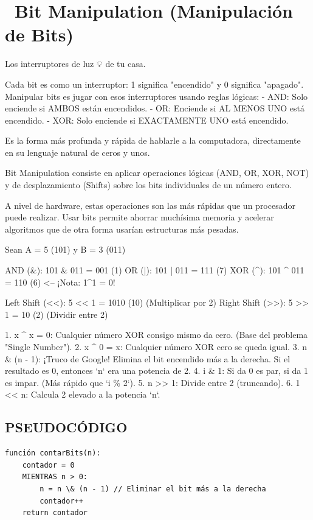 ﻿\chapter[\emj{🔢}~Bit Manipulation (Manipulación de Bits)]{~Bit Manipulation (Manipulación de Bits)}

\begin{dsaquees}
Los interruptores de luz 💡 de tu casa. 

Cada bit es como un interruptor: 1 significa "encendido" y 0 significa
"apagado". Manipular bits es jugar con esos interruptores usando 
reglas lógicas:
- AND: Solo enciende si AMBOS están encendidos.
- OR: Enciende si AL MENOS UNO está encendido.
- XOR: Solo enciende si EXACTAMENTE UNO está encendido.

Es la forma más profunda y rápida de hablarle a la computadora,
directamente en su lenguaje natural de ceros y unos.
\end{dsaquees}
\begin{dsaotraforma}
Bit Manipulation consiste en aplicar operaciones lógicas (AND, OR, 
XOR, NOT) y de desplazamiento (Shifts) sobre los bits individuales de 
un número entero.

A nivel de hardware, estas operaciones son las más rápidas que un 
procesador puede realizar. Usar bits permite ahorrar muchísima 
memoria y acelerar algoritmos que de otra forma usarían estructuras
más pesadas.
\end{dsaotraforma}
\begin{dsadiagrama}
Sean A = 5 (101) y B = 3 (011)

AND (\&):  101 \& 011 = 001 (1)
OR  (|):  101 | 011 = 111 (7)
XOR (^):  101 ^ 011 = 110 (6)  <-- ¡Nota: 1^1 = 0!

Left Shift (<<): 5 << 1 = 1010 (10)  (Multiplicar por 2)
Right Shift (>>): 5 >> 1 = 10 (2)    (Dividir entre 2)
\end{dsadiagrama}
\begin{dsacomofunciona}
1. x \textasciicircum{} x = 0: Cualquier número XOR consigo mismo da cero. 
   (Base del problema "Single Number").
2. x \textasciicircum{} 0 = x: Cualquier número XOR cero se queda igual.
3. n \& (n - 1): ¡Truco de Google! Elimina el bit encendido más a la 
   derecha. Si el resultado es 0, entonces `n` era una potencia de 2.
4. i \& 1: Si da 0 es par, si da 1 es impar. (Más rápido que `i \% 2`).
5. n >> 1: Divide entre 2 (truncando).
6. 1 << n: Calcula 2 elevado a la potencia `n`.
\end{dsacomofunciona}
\section*{PSEUDOCÓDIGO}
\hrulefill
\begin{verbatim}
función contarBits(n):
    contador = 0
    MIENTRAS n > 0:
        n = n \& (n - 1) // Eliminar el bit más a la derecha
        contador++
    return contador
\end{verbatim}
